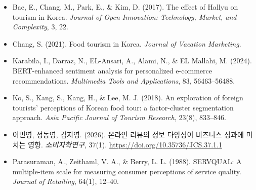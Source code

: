 \documentclass[10pt,a4paper]{article}
\newcommand{\subsect}[1]{\vspace{6pt}\noindent{\large\bfseries #1}\par\vspace{2pt}}
\begin{document}
\vspace{8pt}
\subsect{참고문헌}
\begin{itemize}[leftmargin=14pt, itemsep=3pt]
  \item Bae, E., Chang, M., Park, E., \& Kim, D. (2017). The effect of
        Hallyu on tourism in Korea. \textit{Journal of Open Innovation:
        Technology, Market, and Complexity}, 3, 22.
  \item Chang, S. (2021). Food tourism in Korea. \textit{Journal of
        Vacation Marketing}.
  \item Karabila, I., Darraz, N., EL-Ansari, A., Alami, N., \& EL
        Mallahi, M. (2024). BERT-enhanced sentiment analysis for
        personalized e-commerce recommendations. \textit{Multimedia
        Tools and Applications}, 83, 56463--56488.
  \item Ko, S., Kang, S., Kang, H., \& Lee, M. J. (2018). An exploration
        of foreign tourists' perceptions of Korean food tour: a
        factor-cluster segmentation approach. \textit{Asia Pacific
        Journal of Tourism Research}, 23(8), 833--846.
  \item 이민영, 정동영, 김지영. (2026). 온라인 리뷰의 정보 다양성이
        비즈니스 성과에 미치는 영향. \textit{소비자학연구}, 37(1).
        \url{https://doi.org/10.35736/JCS.37.1.1}
  \item Parasuraman, A., Zeithaml, V. A., \& Berry, L. L. (1988).
        SERVQUAL: A multiple-item scale for measuring consumer
        perceptions of service quality. \textit{Journal of Retailing},
        64(1), 12--40.
\end{itemize}
\end{document}
